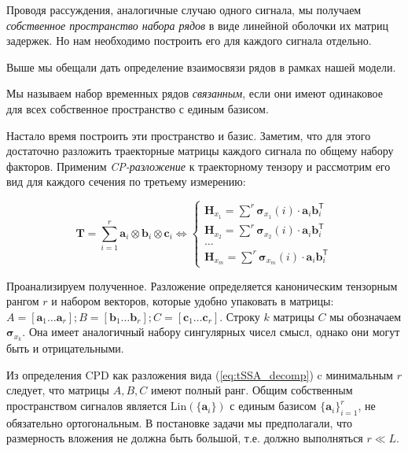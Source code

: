 	    	Проводя рассуждения, аналогичные случаю одного сигнала, мы получаем \emph{собственное пространство набора рядов} в виде линейной оболочки их матриц задержек. Но нам необходимо построить его для каждого сигнала отдельно.
	    	
	    	Выше мы обещали дать определение взаимосвязи рядов в рамках нашей модели. 
	    	
	    	\begin{Def}
	    		Мы называем набор временных рядов \emph{связанным}, если они имеют одинаковое для всех собственное пространство с единым базисом.
	    	\end{Def}
	    	
	    	Настало время построить эти пространство и базис. Заметим, что для этого достаточно разложить траекторные матрицы каждого сигнала по общему набору факторов. Применим \textit{CP-разложение} к траекторному тензору и рассмотрим его вид для каждого сечения по третьему измерению:
	    	
	    	\begin{equation}\label{eq:tSSA_decomp}
	    		\mathbf{T} = \sum\limits_{i = 1}^{r} \mathbf{a}_i \otimes \mathbf{b}_i \otimes \mathbf{c}_i \Leftrightarrow \begin{cases}
	    			\mathbf{H}_{x_1} = \sum\limits^{r} \boldsymbol{\sigma}_{x_1}(i) \cdot \mathbf{a}_i  \mathbf{b}_i^{\mathsf{T}}  \\
	    			\mathbf{H}_{x_2} = \sum\limits^{r} \boldsymbol{\sigma}_{x_2}(i) \cdot \mathbf{a}_i  \mathbf{b}_i^{\mathsf{T}} \\
	    			\ldots \\
	    			\mathbf{H}_{x_m} = \sum\limits^{r} \boldsymbol{\sigma}_{x_m}(i) \cdot \mathbf{a}_i  \mathbf{b}_i^{\mathsf{T}} 
	    		\end{cases}
	    	\end{equation}
	    
	    	Проанализируем полученное. Разложение определяется каноническим тензорным рангом $ r $ и набором векторов, которые удобно упаковать в матрицы: $ A = [\mathbf{a}_1 \ldots \mathbf{a}_r]; B = [\mathbf{b}_1 \ldots \mathbf{b}_r]; C = [\mathbf{c}_1 \ldots \mathbf{c}_r] $. Строку $ k $ матрицы $ C $ мы обозначаем $ \boldsymbol{\sigma}_{x_k} $. Она имеет аналогичный набору сингулярных чисел смысл, однако они могут быть и отрицательными.
	    	
	    	Из определения CPD как разложения вида (\ref{eq:tSSA_decomp}) c минимальным $ r $ следует, что матрицы $ A, B, C $ имеют полный ранг. Общим собственным пространством сигналов является $ \text{Lin}(\{\mathbf{a}_i\}) $ с единым базисом $ \{\mathbf{a}_i\}_{i = 1}^r $, не обязательно ортогональным. В постановке задачи мы предполагали, что размерность вложения не должна быть большой, т.е. должно выполняться $ r \ll L $.
	    	
